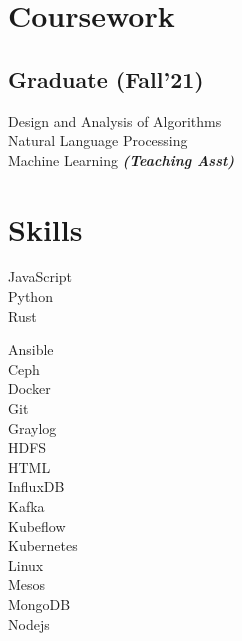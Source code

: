 \documentclass[]{deedy-resume-openfont}
\begin{document}
\begin{minipage}[t]{0.33\textwidth}
\section{Coursework}
\subsection{Graduate
(Fall'21)}
\textbullet{} Design and Analysis of Algorithms \\
\textbullet{} Natural Language Processing \\
\textbullet{} Machine Learning
{\footnotesize \textit{\textbf{(Teaching Asst) }}} 
\sectionsep


\section{Skills}
\textbullet{} JavaScript \\
\textbullet{} Python \\
\textbullet{} Rust  \\

\textbullet{} Ansible \\
\textbullet{} Ceph \\
\textbullet{} Docker \\
\textbullet{} Git \\
\textbullet{} Graylog \\
\textbullet{} HDFS \\
\textbullet{} HTML \\
\textbullet{} InfluxDB \\
\textbullet{} Kafka \\
\textbullet{} Kubeflow \\
\textbullet{} Kubernetes \\
\textbullet{} Linux \\
\textbullet{} Mesos \\
\textbullet{} MongoDB \\
\textbullet{} Nodejs \\
\sectionsep

%
%

\end{minipage} 
\hfill
\end{document}
